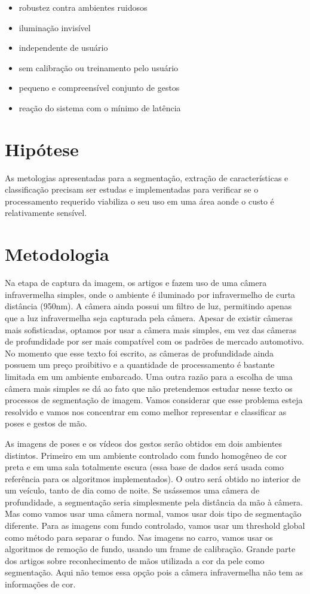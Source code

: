 \begin{itemize}
\item robustez contra ambientes ruidosos
\item iluminação invisível
\item independente de usuário
\item sem calibração ou treinamento pelo usuário
\item pequeno e compreensível conjunto de gestos
\item reação do sistema com o mínimo de latência
\end{itemize}

\section{Hipótese}

As metologias apresentadas para a segmentação, extração de características e classificação precisam ser estudas e implementadas para verificar se o processamento requerido viabiliza o seu uso em uma área aonde o custo é relativamente sensível.

\section{Metodologia}

Na etapa de captura da imagem, os artigos \cite{ref2} e \cite{ref1} fazem uso de uma câmera infravermelha simples, onde o ambiente é iluminado por infravermelho de curta distância (950nm). A câmera ainda possui um filtro de luz, permitindo apenas que a luz infravermelha seja capturada pela câmera. Apesar de existir câmeras mais sofisticadas, optamos por usar a câmera mais simples, em vez das câmeras de profundidade por ser mais compatível com os padrões de mercado automotivo. No momento que esse texto foi escrito, as câmeras de profundidade ainda possuem um preço proibitivo e a quantidade de processamento é bastante limitada em um ambiente embarcado. Uma outra razão para a escolha de uma câmera mais simples se dá ao fato que não pretendemos estudar nesse texto os processos de segmentação de imagem. Vamos considerar que esse problema esteja resolvido e vamos nos concentrar em como melhor representar e classificar as poses e gestos de mão.

As imagens de poses e os vídeos dos gestos serão obtidos em  dois ambientes distintos. Primeiro em um ambiente controlado com fundo homogêneo de cor preta e em uma sala totalmente escura (essa base de dados será usada como referência para os algoritmos implementados). O outro será obtido no interior de um veículo, tanto de dia como de noite.
Se usássemos uma câmera de profundidade, a segmentação seria simplesmente pela distância da mão à câmera. Mas como vamos usar uma câmera normal, vamos usar dois tipo de segmentação diferente. 
Para as imagens com fundo controlado, vamos usar um threshold global como método para separar o fundo. Nas imagens no carro, vamos usar os algoritmos de remoção de fundo, usando um frame de calibração.
Grande parte dos artigos sobre reconhecimento de mãos utilizada a cor da pele como segmentação. Aqui não temos essa opção pois a câmera infravermelha não tem as informações de cor.

